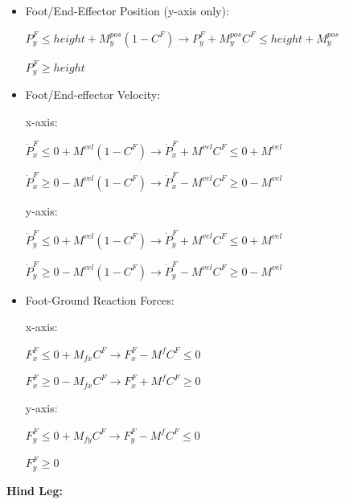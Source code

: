 \documentclass[a4paper,10pt]{article}
\begin{document}
\begin{itemize}
	\item Foot/End-Effector Position (y-axis only):
	
	$P^F_y \leq height + M^{pos}_y(1-C^F) \rightarrow P^F_y +  M^{pos}_yC^F \leq height + M^{pos}_y$
	
	\vspace{2mm}
	
	$P^F_y \geq height$
	
	\item Foot/End-effector Velocity:
	
	x-axis:
	
	$\dot{P}^F_x \leq 0 + M^{vel}(1-C^F) \rightarrow \dot{P}^F_x + M^{vel}C^F \leq 0 + M^{vel}$
	
	$\dot{P}^F_x \geq 0 - M^{vel}(1-C^F) \rightarrow \dot{P}^F_x - M^{vel}C^F \geq 0 - M^{vel}$
	
	y-axis:
	
	$\dot{P}^F_y \leq 0 + M^{vel}(1-C^F) \rightarrow \dot{P}^F_y + M^{vel}C^F \leq 0 + M^{vel}$
	
	$\dot{P}^F_y \geq 0 - M^{vel}(1-C^F) \rightarrow \dot{P}^F_y - M^{vel}C^F \geq 0 - M^{vel}$
	
	\item Foot-Ground Reaction Forces:
	
	x-axis:
	
	$F^F_x \leq 0 + M_{fx}C^F \rightarrow F^F_x - M^fC^F \leq 0$
	
	$F^F_x \geq 0 - M_{fx}C^F \rightarrow F^F_x + M^fC^F \geq 0$
	
	y-axis:
	
	$F^F_y \leq 0 + M_{fy}C^F \rightarrow F^F_y - M^fC^F \leq 0$
	
	$F^F_y \geq 0$
	
\end{itemize}

\textbf{Hind Leg:}
\end{document}
